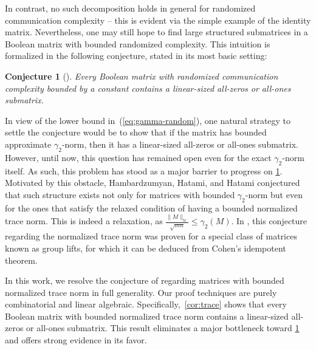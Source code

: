 \documentclass[11pt]{amsart}
\theoremstyle{plain}
\newtheorem{conjecture}[theorem]{Conjecture}
\theoremstyle{definition}
\DeclareMathOperator{\tr}{tr}
\newcommand{\RomanNumeralCaps}[1]{\MakeUppercase{\romannumeral #1}}
\newcommand{\istvan}[1]{\textcolor{red}{it: #1}}
\newcommand{\lianna}[1]{\textcolor{blue}{lh: #1}}
\begin{document}
In contrast, no such decomposition holds in general for randomized communication complexity -- this is evident via the simple example of the identity matrix. Nevertheless, one may still hope to find large structured submatrices in a Boolean matrix with bounded randomized complexity. This intuition is formalized in the following conjecture, stated in its most basic setting:
\begin{conjecture}[\cite{CLV,HHH}]\label{conj:randomized}
Every Boolean matrix with randomized communication
complexity bounded by a constant contains a linear-sized all-zeros or all-ones submatrix.
\end{conjecture}
In view of the lower bound in~(\ref{eq:gamma-random}), one natural strategy to settle the conjecture would be to show that if the matrix has bounded approximate $\gamma_2$-norm, then it has a linear-sized all-zeros or all-ones submatrix. However, until now, this question has remained open even for the exact $\gamma_2$-norm itself. As such, this problem has stood as a major barrier to progress on  \cref{conj:randomized}. Motivated by this obstacle, Hambardzumyan, Hatami, and Hatami \cite[Conjecture \RomanNumeralCaps{2}]{HHH} conjectured that such structure exists not only for matrices with bounded $\gamma_2$-norm but even for the ones that satisfy the relaxed condition of having a bounded normalized trace norm. This is indeed a relaxation, as 
$\frac{\|M\|_{\tr}}{\sqrt{mn}} \leq \gamma_2(M)$. 
In \cite{HHH}, this conjecture regarding the normalized trace norm was proven for a special class of matrices known as group lifts, for which it can be deduced from Cohen's idempotent theorem. %


In this work, we resolve the conjecture of \cite{HHH} regarding matrices with bounded normalized trace norm in full generality. Our proof techniques are purely combinatorial and linear algebraic. Specifically,~\cref{cor:trace} shows that every Boolean matrix with bounded normalized trace norm contains a linear-sized all-zeros or all-ones submatrix.
This result eliminates a major bottleneck toward  \cref{conj:randomized} and offers strong evidence in its favor. %

\end{document}
